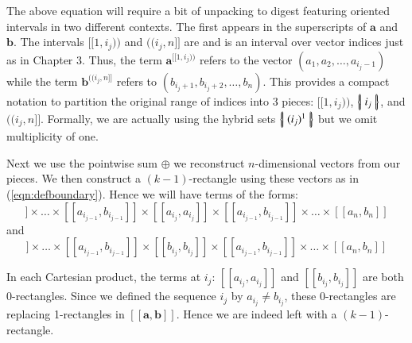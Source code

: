 The above equation will require a bit of unpacking to digest featuring oriented intervals in two different contexts.
The first appears in the superscripts of $\boldsymbol{a}$ and $\boldsymbol{b}$. 
The intervals $[\![1, i_j)\!)$ and $(\!(i_j, n]\!]$ are  and is an interval over vector indices just as in Chapter 3.
Thus, the term $\boldsymbol{a}^{[\![1,i_j)\!)}$ refers to the vector $(a_1, a_2, \ldots, a_{i_j-1})$ 
while the term $\boldsymbol{b}^{(\!(i_j,n]\!]}$ refers to $(b_{i_j+1}, b_{i_j+2}, \ldots, b_{n})$.
This provides a compact notation to partition the original range of indices into 3 pieces: $[\![ 1,i_j )\!)$, $\left\{ \! \left| \; i_j \; \right| \! \right\}$, and $(\!(i_j, n]\!]$.
Formally, we are actually using the hybrid sets $\left\{ \! \left| \; (i_j)^1 \; \right| \! \right\}$ but we omit multiplicity of one.


Next we use the pointwise sum $\oplus$ we reconstruct $n$-dimensional vectors from our pieces.
We then construct a $(k-1)$-rectangle using these vectors as in (\ref{eqn:defboundary}).
Hence we will have terms of the forms:
\begin{equation*}
	[\![a_1, b_1]\!]
	\times \ldots \times
	[\![a_{i_{j-1}}, b_{i_{j-1}}]\!]
	\times
	[\![a_{i_j}, a_{i_j}]\!]
	\times
	[\![a_{i_{j-1}}, b_{i_{j-1}}]\!]
	\times \ldots \times
	[\![a_n, b_n]\!]
\end{equation*}
and
\begin{equation*}
	[\![a_1, b_1]\!]
	\times \ldots \times
	[\![a_{i_{j-1}}, b_{i_{j-1}}]\!]
	\times
	[\![b_{i_j}, b_{i_j}]\!]
	\times
	[\![a_{i_{j-1}}, b_{i_{j-1}}]\!]
	\times \ldots \times
	[\![a_n, b_n]\!]
\end{equation*}


In each Cartesian product, the terms at $i_j$: $[\![a_{i_j}, a_{i_j}]\!]$ and $[\![b_{i_j}, b_{i_j}]\!]$ are both 0-rectangles.
Since we defined the sequence $i_j$ by $a_{i_j} \neq b_{i_j}$, 
these 0-rectangles are replacing 1-rectangles in $[\![\boldsymbol{a}, \boldsymbol{b}]\!]$.
Hence we are indeed left with a $(k-1)$-rectangle.




